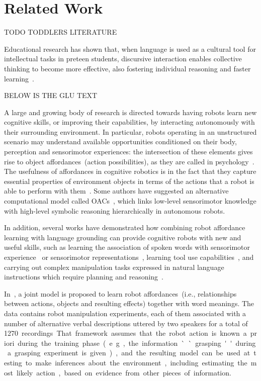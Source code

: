 
\section{Related Work}

TODO TODDLERS LITERATURE

Educational research has shown that, when language is used as a cultural tool for intellectual tasks in preteen students, discursive interaction enables collective thinking to become more effective, also fostering individual reasoning and faster learning~\cite{rojas:2003:ijer}.

BELOW IS THE GLU TEXT

A large and growing body of research is directed towards having robots learn new cognitive skills, or improving their capabilities, by interacting autonomously with their surrounding environment. In particular, robots operating in an unstructured scenario may understand available opportunities conditioned on their body, perception and sensorimotor experiences: the intersection of these elements gives rise to object affordances~(action possibilities), as they are called in psychology~\cite{gibson:2014}. The usefulness of affordances in cognitive robotics is in the fact that they capture essential properties of environment objects in terms of the actions that a robot is able to perform with them~\cite{montesano:2008,jamone:2016:tcds}.
Some authors have suggested an alternative computational model called \acp{OAC}~\cite{kruger:2011:ras}, which links low-level sensorimotor knowledge with high-level symbolic reasoning hierarchically in autonomous robots.

In addition, several works have demonstrated how combining robot affordance learning with language grounding can provide cognitive robots with new and useful skills, such as learning the association of spoken words with sensorimotor experience~\cite{salvi:2012:smcb,morse:2016:cogsci} or sensorimotor representations~\cite{stramandinoli:2016:icdl}, learning tool use capabilities~\cite{goncalves:2014:icarsc,goncalves:2014:icdl}, and carrying out complex manipulation tasks expressed in natural language instructions which require planning and reasoning~\cite{antunes:2016:icra}.

In~\cite{salvi:2012:smcb}, a joint model is proposed to learn robot affordances~(i.e., relationships between actions, objects and resulting effects) together with word meanings. The data contains robot manipulation experiments, each of them associated with a number of alternative verbal descriptions uttered by two speakers for a total of \SI{1270}~recordings. That framework assumes that the robot action is known a~priori during the training phase~(e.g., the information ``grasping'' during a grasping experiment is given), and the resulting model can be used at testing to make inferences about the environment, including estimating the most likely action, based on evidence from other pieces of information.

